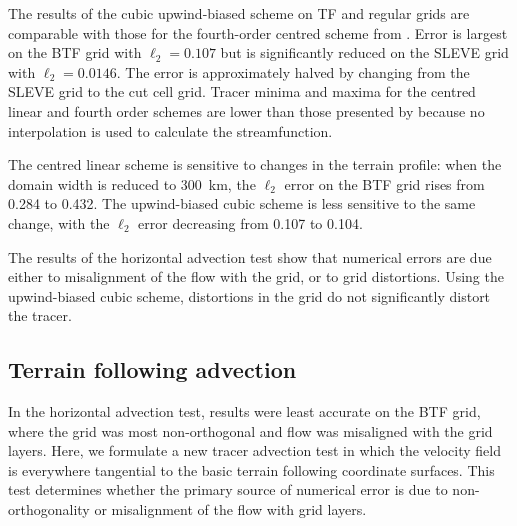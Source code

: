 \documentclass[draft]{ametsoc}
\begin{document}
The results of the cubic upwind-biased scheme on TF and regular grids are comparable with those for the fourth-order centred scheme from \citet{schaer2002}.  Error is largest on the BTF grid with \(\ell_2 = \num{0.107}\) but is significantly reduced on the SLEVE grid with \(\ell_2 = \num{0.0146}\).  The error is approximately halved by changing from the SLEVE grid to the cut cell grid.
Tracer minima and maxima for the centred linear and fourth order schemes are lower than those presented by \citet{schaer2002} because no interpolation is used to calculate the streamfunction.

The centred linear scheme is sensitive to changes in the terrain profile: when the domain width is reduced to \SI{300}{\kilo\meter}, the $\ell_2$ error on the BTF grid rises from \num{0.284} to \num{0.432}.  The upwind-biased cubic scheme is less sensitive to the same change, with the $\ell_2$ error decreasing from \num{0.107} to \num{0.104}.

The results of the horizontal advection test show that numerical errors are due either to misalignment of the flow with the grid, or to grid distortions.  Using the upwind-biased cubic scheme, distortions in the grid do not significantly distort the tracer.



\subsection{Terrain following advection}
In the horizontal advection test, results were least accurate on the BTF grid, where the grid was most non-orthogonal and flow was misaligned with the grid layers.  Here, we formulate a new tracer advection test in which the velocity field is everywhere tangential to the basic terrain following coordinate surfaces.  This test determines whether the primary source of numerical error is due to non-orthogonality or misalignment of the flow with grid layers. 
\end{document}
